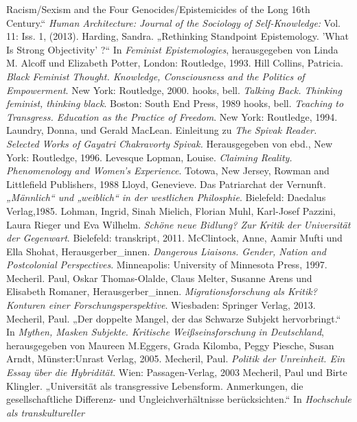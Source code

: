 \begin{thebibliography}{100}
Racism/Sexism and the Four Genocides/Epistemicides of the Long 16th Century.“
\emph{Human Architecture: Journal of the Sociology of Self-Knowledge:} Vol. 11: Iss. 1, (2013). 
 Harding, Sandra. „Rethinking Standpoint Epistemology. 'What
Is Strong Objectivity' ?“ In \emph{Feminist Epistemologies}, herausgegeben von Linda M. Alcoff und Elizabeth Potter,  London: Routledge, 1993.
 Hill Collins, Patricia. \emph{Black Feminist Thought.
Knowledge, Consciousness and the Politics of Empowerment}. New York: Routledge, 2000.
 hooks, bell. \emph{Talking Back. Thinking feminist, thinking black}. Boston: South End Press, 1989
 hooks, bell. \emph{Teaching to Transgress. Education as the Practice of Freedom}. New York: Routledge, 1994.
 Laundry, Donna, und Gerald MacLean. Einleitung zu \emph{The Spivak Reader. Selected Works of
Gayatri Chakravorty Spivak.} Herausgegeben von ebd., New York: Routledge, 1996.
 Levesque Lopman, Louise. \emph{Claiming Reality. Phenomenology and
Women's Experience}. Totowa, New Jersey, Rowman and Littlefield Publishers, 1988
 Lloyd, Genevieve. Das Patriarchat der Vernunft. \emph{„Männlich“ und „weiblich“ in der westlichen
Philosphie}. Bielefeld: Daedalus Verlag,1985. 
 Lohman, Ingrid,  Sinah Mielich, Florian Muhl, Karl-Josef Pazzini, Laura Rieger und Eva Wilhelm. 
\emph{Schöne neue Bidlung? Zur Kritik der Universität der Gegenwart}. Bielefeld: transkript, 2011.
 McClintock, Anne, Aamir Mufti und Ella Shohat,
Herausgerber\_innen. \emph{Dangerous Liaisons.
Gender, Nation and Postcolonial Perspectives}. Minneapolis: University of Minnesota Press, 1997.
 Mecheril. Paul, Oskar Thomas-Olalde, Claus Melter, Susanne Arens und Elisabeth Romaner,
Herausgerber\_innen. \emph{Migrationsforschung als Kritik? Konturen einer
Forschungsperspektive}. Wiesbaden: Springer Verlag, 2013.
 Mecheril, Paul. „Der doppelte Mangel, der das Schwarze Subjekt hervorbringt.“ In \textit{Mythen, Masken Subjekte. Kritische Weißseinsforschung in Deutschland}, herausgegeben von Maureen M.Eggers, Grada Kilomba, Peggy Piesche, Susan Arndt, Münster:Unrast Verlag, 2005.
 Mecheril, Paul. \emph{Politik der Unreinheit. Ein Essay über die Hybridität}. Wien: Passagen-Verlag, 2003
 Mecheril, Paul und  Birte Klingler. „Universität als
transgressive Lebensform. Anmerkungen, die gesellschaftliche Differenz- und
Ungleichverhältnisse berücksichten.“ In \emph{Hochschule als transkultureller
}
\end{thebibliography}
